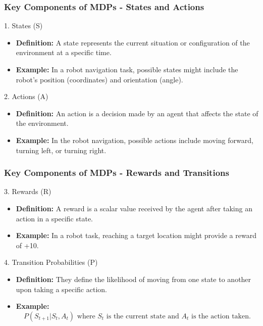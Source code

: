 \documentclass[aspectratio=169]{beamer}
\begin{document}
\begin{frame}[fragile]
    \frametitle{Key Components of MDPs - States and Actions}
    \begin{block}{1. States (S)}
        \begin{itemize}
            \item \textbf{Definition:} A state represents the current situation or configuration of the environment at a specific time. 
            \item \textbf{Example:} In a robot navigation task, possible states might include the robot's position (coordinates) and orientation (angle).
        \end{itemize}
    \end{block}

    \begin{block}{2. Actions (A)}
        \begin{itemize}
            \item \textbf{Definition:} An action is a decision made by an agent that affects the state of the environment.
            \item \textbf{Example:} In the robot navigation, possible actions include moving forward, turning left, or turning right.
        \end{itemize}
    \end{block}
\end{frame}

\begin{frame}[fragile]
    \frametitle{Key Components of MDPs - Rewards and Transitions}
    \begin{block}{3. Rewards (R)}
        \begin{itemize}
            \item \textbf{Definition:} A reward is a scalar value received by the agent after taking an action in a specific state.
            \item \textbf{Example:} In a robot task, reaching a target location might provide a reward of +10.
        \end{itemize}
    \end{block}

    \begin{block}{4. Transition Probabilities (P)}
        \begin{itemize}
            \item \textbf{Definition:} They define the likelihood of moving from one state to another upon taking a specific action.
            \item \textbf{Example:} 
            \begin{equation}
            P(S_{t+1} | S_t, A_t) \text{ where } S_t \text{ is the current state and } A_t \text{ is the action taken.}
            \end{equation}
        \end{itemize}
    \end{block}
\end{frame}
\end{document}
